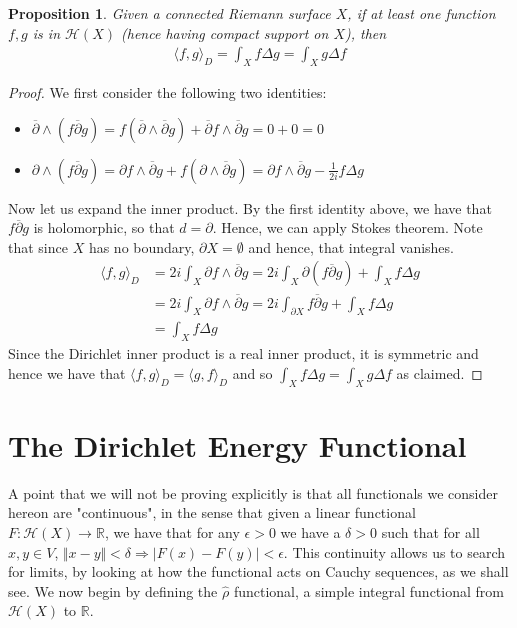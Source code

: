\documentclass[11pt]{report}
\newtheorem{prop}[thm]{Proposition}
\theoremstyle{definition}
\begin{document}
\begin{prop}\label{InnerLaplacian}
  Given a connected Riemann surface $X$, if at least one function $f,g$ is in $\mathcal{H}(X)$ (hence having compact support on $X$), then 
  \begin{align*}
    \langle f, g \rangle_D = \int_X f \Delta g = \int_X g \Delta f
  \end{align*}
\end{prop}
\begin{proof}
  We first consider the following two identities:
  \begin{itemize}
    \item $\overline{\partial}\wedge(f\overline{\partial}g) = f (\overline{\partial}\wedge\overline{\partial} g) + \overline{\partial}f \wedge \overline{\partial}g = 0 + 0 = 0$
    \item $\partial\wedge(f\overline{\partial}g)=\partial f \wedge \overline{\partial}g + f(\partial\wedge\overline{\partial}g)=\partial f \wedge \overline{\partial}g - \frac{1}{2i}f\Delta g$
  \end{itemize}
  Now let us expand the inner product. By the first identity above, we have that $f\overline{\partial}g$ is holomorphic, so that $d = \partial$. Hence, we can apply Stokes theorem. Note that since $X$ has no boundary, $\partial X = \emptyset$ and hence, that integral vanishes.
  \begin{align*}
    \langle f, g \rangle_D &= 2i\int_X \partial f \wedge \overline{\partial}g = 2i\int_X \partial(f\overline{\partial}g)+\int_X f\Delta g \\
    &= 2i\int_X \partial f \wedge \overline{\partial}g = 2i\int_{\partial X} f\overline{\partial}g + \int_X f\Delta g \\
    &= \int_X f\Delta g
  \end{align*}
  Since the Dirichlet inner product is a real inner product, it is symmetric and hence we have that $\langle f, g \rangle_D = \langle g, f \rangle_D $ and so $\int_X f\Delta g = \int_X g \Delta f$ as claimed.
\end{proof}

\section{The Dirichlet Energy Functional}

A point that we will not be proving explicitly is that all functionals we consider hereon are "continuous", in the sense that given a linear functional $F:\mathcal{H}(X) \rightarrow \mathbb{R}$, we have that for any $\epsilon > 0$ we have a $\delta > 0$ such that for all $x,y \in V$, $\Vert x - y \Vert < \delta \Rightarrow |F(x) - F(y)| < \epsilon$. This continuity allows us to search for limits, by looking at how the functional acts on Cauchy sequences, as we shall see.
We now begin by defining the $\hat{\rho}$ functional, a simple integral functional from $\mathcal{H}(X)$ to $\mathbb{R}$. 
\end{document}
